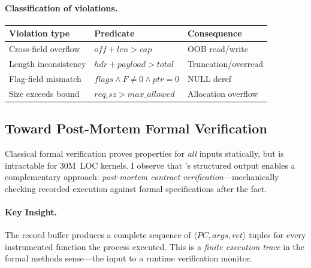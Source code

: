 \documentclass{article}
\begin{document}
\paragraph{Classification of violations.}
\begin{center}
\small
\begin{tabular}{@{}lll@{}}
\toprule
\textbf{Violation type} & \textbf{Predicate} & \textbf{Consequence} \\
\midrule
Cross-field overflow & $\mathit{off} + \mathit{len} > \mathit{cap}$ & OOB read/write \\
Length inconsistency & $\mathit{hdr} + \mathit{payload} > \mathit{total}$ & Truncation/overread \\
Flag-field mismatch & $\mathit{flags} \wedge F \neq 0 \wedge \mathit{ptr} = 0$ & NULL deref \\
Size exceeds bound & $\mathit{req\_sz} > \mathit{max\_allowed}$ & Allocation overflow \\
\bottomrule
\end{tabular}
\end{center}

\subsection{Toward Post-Mortem Formal Verification}\label{sec:postmortem}

Classical formal verification proves properties for \emph{all} inputs
statically, but is intractable for 30M~LOC kernels. I observe that
\toolname{}'s structured output enables a complementary approach:
\emph{post-mortem contract verification}---mechanically checking recorded
execution against formal specifications after the fact.

\paragraph{Key Insight.} The record buffer produces a complete sequence of
$\langle \mathit{PC}, \mathit{args}, \mathit{ret} \rangle$ tuples for every
instrumented function the process executed. This is a \emph{finite execution
trace} in the formal methods sense---the input to a runtime verification
monitor.
\end{document}

